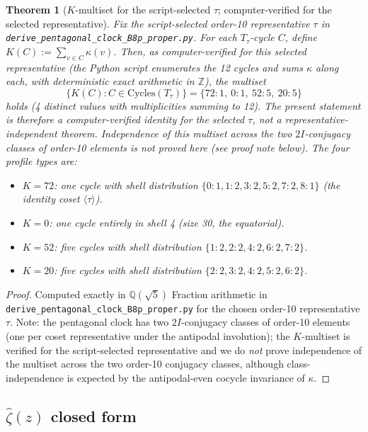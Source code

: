 \documentclass[11pt, a4paper]{amsart}
\newtheorem{theorem}{Theorem}[section]
\theoremstyle{definition}
\newcommand{\Z}{\mathbb{Z}}
\newcommand{\Q}{\mathbb{Q}}
\begin{document}
\begin{theorem}[$K$-multiset for the script-selected $\tau$; computer-verified for the selected representative]\label{thm:K_multiset}
Fix the script-selected order-10 representative $\tau$ in
\texttt{derive\_pentagonal\_clock\_B8p\_proper.py}.  For each
$T_\tau$-cycle $C$, define
$K(C) := \sum_{v \in C} \kappa(v)$. Then, as
\emph{computer-verified for this selected representative} (the
Python script enumerates the 12 cycles and sums $\kappa$ along
each, with deterministic exact arithmetic in $\Z$), the multiset
\[
\{K(C) : C \in \mathrm{Cycles}(T_\tau)\} = \{72:1,\ 0:1,\ 52:5,\ 20:5\}
\]
holds (4 distinct values with multiplicities summing to 12).  The
present statement is therefore a computer-verified identity for
the selected $\tau$, not a representative-independent theorem.
Independence of this multiset across the two $2I$-conjugacy
classes of order-10 elements is not proved here (see proof note
below).
The four profile types are:
\begin{itemize}
\item $K = 72$: one cycle with shell distribution $\{0:1, 1:2, 3:2, 5:2, 7:2, 8:1\}$
  (the identity coset $\langle \tau \rangle$).
\item $K = 0$: one cycle entirely in shell 4 (size 30, the equatorial).
\item $K = 52$: five cycles with shell distribution $\{1:2, 2:2, 4:2, 6:2, 7:2\}$.
\item $K = 20$: five cycles with shell distribution $\{2:2, 3:2, 4:2, 5:2, 6:2\}$.
\end{itemize}
\end{theorem}

\begin{proof}
Computed exactly in $\Q(\sqrt 5)$ Fraction arithmetic in
\texttt{derive\_pentagonal\_clock\_B8p\_proper.py} for the chosen
order-10 representative $\tau$.  Note: the pentagonal clock has
two $2I$-conjugacy classes of order-10 elements (one per coset
representative under the antipodal involution); the $K$-multiset is
verified for the script-selected representative and we do
\emph{not} prove independence of the multiset across the two
order-10 conjugacy classes, although class-independence is
expected by the antipodal-even cocycle invariance of $\kappa$.
\end{proof}

\subsection{$\widehat\zeta(z)$ closed form}\label{subsec:zhat_form}
\end{document}
